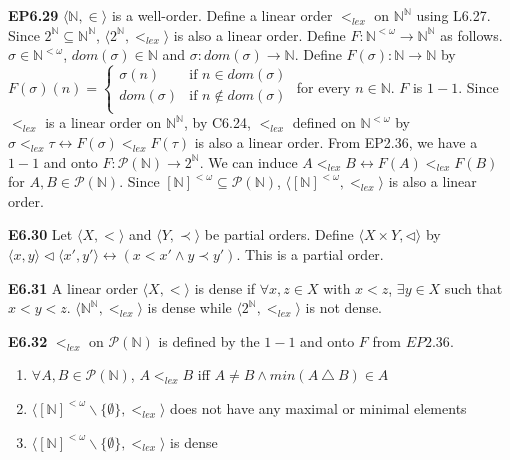 \documentclass[10pt, landscape]{article}
\begin{document}
\begin{multicols*}{3}
\textbf{EP6.29} $\langle \mathbb{N}, \in \rangle$ is a well-order. Define a linear order $<_{lex}$ on $\mathbb{N}^\mathbb{N}$ using L6.27. Since $2^\mathbb{N} \subseteq \mathbb{N}^\mathbb{N}$, $\langle 2^\mathbb{N}, <_{lex}\rangle$ is also a linear order. Define $F:\mathbb{N}^{<\omega} \rightarrow \mathbb{N}^\mathbb{N}$ as follows. $\sigma \in \mathbb{N}^{<\omega}$, $dom(\sigma)\in\mathbb{N}$ and $\sigma:dom(\sigma)\rightarrow \mathbb{N}$. Define $F(\sigma):\mathbb{N}\rightarrow\mathbb{N}$ by $F(\sigma)(n) =
    \left\{
    \begin{array}{lr}
      \sigma(n) & \text{if $n \in dom(\sigma)$} \\
      dom(\sigma) & \text{if $n \notin dom(\sigma)$} \\
    \end{array}
    \right.
    $
for every $n \in \mathbb{N}$. $F$ is $1-1$. Since $<_{lex}$ is a linear order on $\mathbb{N}^\mathbb{N}$, by C6.24, $<_{lex}$ defined on $\mathbb{N}^{<\omega}$ by $\sigma <_{lex} \tau \leftrightarrow F(\sigma) <_{lex} F(\tau)$ is also a linear order. From EP2.36, we have a $1-1$ and onto $F:\mathcal{P}(\mathbb{N})\rightarrow2^\mathbb{N}$. We can induce $A <_{lex} B \leftrightarrow F(A) <_{lex} F(B)$ for $A, B \in \mathcal{P}(\mathbb{N})$. Since $[\mathbb{N}]^{<\omega}\subseteq\mathcal{P}(\mathbb{N})$, $\langle [\mathbb{N}]^{<\omega}, <_{lex} \rangle$ is also a linear order.

\textbf{E6.30} Let $\langle X, < \rangle$ and $\langle Y, \prec \rangle$ be partial orders. Define $\langle X \times Y, \lhd \rangle$ by $\langle x, y \rangle \lhd \langle x', y' \rangle \leftrightarrow (x < x' \land y \prec y')$. This is a partial order.

\textbf{E6.31} A linear order $\langle X, < \rangle$ is dense if $\forall x, z \in X$ with $x < z$, $\exists y \in X$ such that $x < y < z$. $\langle \mathbb{N}^\mathbb{N}, <_{lex} \rangle$ is dense while $\langle 2^\mathbb{N}, <_{lex} \rangle$ is not dense.

\textbf{E6.32} $<_{lex}$ on $\mathcal{P}(\mathbb{N})$ is defined by the $1-1$ and onto $F$ from $EP2.36$.
\begin{enumerate}
    \item $\forall A, B \in \mathcal{P}(\mathbb{N})$, $A <_{lex} B$ iff $A \neq B \land min(A \ 
    \triangle \ B) \in A$
    \item $\langle [\mathbb{N}]^{<\omega} \backslash \{\emptyset\}, <_{lex} \rangle$ does not have any maximal or minimal elements
    \item $\langle [\mathbb{N}]^{<\omega} \backslash \{\emptyset\}, <_{lex} \rangle$ is dense
\end{enumerate}


\end{multicols*}
\end{document}

